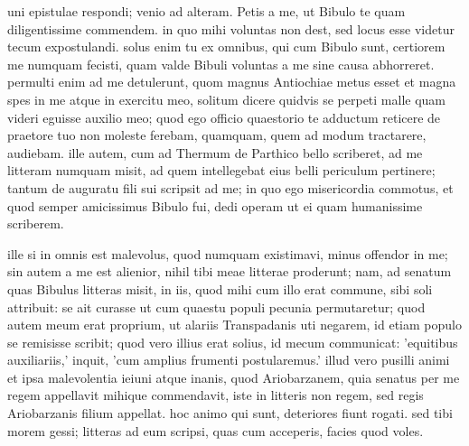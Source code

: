  uni epistulae respondi; venio ad alteram. Petis a me, ut Bibulo te quam diligentissime commendem. in quo mihi voluntas non dest, sed locus esse videtur tecum expostulandi. solus enim tu ex omnibus, qui cum Bibulo sunt, certiorem me numquam fecisti, quam valde Bibuli voluntas a me sine causa abhorreret. permulti enim ad me detulerunt, quom magnus Antiochiae metus esset et magna spes in me atque in exercitu meo, solitum dicere quidvis se perpeti malle quam videri eguisse auxilio meo; quod ego officio quaestorio te adductum reticere de praetore tuo non moleste ferebam, quamquam, quem ad modum tractarere, audiebam. ille autem, cum ad Thermum de Parthico bello scriberet, ad me litteram numquam misit, ad quem intellegebat eius belli periculum pertinere; tantum de auguratu fili sui scripsit ad me; in quo ego misericordia commotus, et quod semper amicissimus Bibulo fui, dedi operam ut ei quam humanissime scriberem.

 ille si in omnis est malevolus, quod numquam existimavi, minus offendor in me; sin autem a me est alienior, nihil tibi meae litterae proderunt; nam, ad senatum quas Bibulus litteras misit, in iis, quod mihi cum illo erat commune, sibi soli attribuit: se ait curasse ut cum quaestu populi pecunia permutaretur; quod autem meum erat proprium, ut alariis Transpadanis uti negarem, id etiam populo se remisisse scribit; quod vero illius erat solius, id mecum communicat: 'equitibus auxiliariis,' inquit, 'cum amplius frumenti postularemus.' illud vero pusilli animi et ipsa malevolentia ieiuni atque inanis, quod Ariobarzanem, quia senatus per me regem appellavit mihique commendavit, iste in litteris non regem, sed regis Ariobarzanis filium appellat. hoc animo qui sunt, deteriores fiunt rogati. sed tibi morem gessi; litteras ad eum scripsi, quas cum acceperis, facies quod voles.
